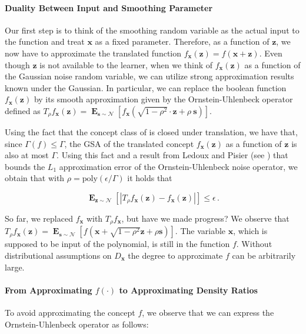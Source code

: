 \documentclass{theoretics}
\renewcommand\vec[1]{\mathbf{#1}}
\DeclareMathOperator*{\E}{\mathbf{E}}
\newcommand{\1}{\Ind}
\newcommand{\x}{\vec x}
\begin{document}
\paragraph{Duality Between Input and Smoothing Parameter}

Our first step is to think of the smoothing random variable as the actual input to the function and treat $\mathbf{x}$ as a fixed parameter. Therefore, as a function of $\mathbf{z}$, we now have to approximate the translated function $f_{\mathbf{x}}(\mathbf{z}) = f(\mathbf{x} + \mathbf{z})$. Even though $\mathbf{z}$ is not available to the learner, when we think of $f_{\mathbf{x}}(\mathbf{z})$ as a function of the Gaussian noise random variable, we can utilize strong approximation results known under the Gaussian. In particular, we can replace the boolean function $f_{\mathbf{x}}(\vec{z})$ by its smooth approximation given by the Ornstein-Uhlenbeck operator defined as $T_{\rho} f_{\mathbf{x}}(\mathbf{z})=\E_{\vec{s} \sim \mathcal{N}}[f_{\mathbf{x}}(\sqrt{1-\rho^2} \cdot \mathbf{z} + \rho ~ \vec{s} )]$.

Using the fact that the concept class of  is closed under translation, we have that, since $\Gamma(f) \leq \Gamma$, the GSA of the translated concept $f_{\mathbf{x}}(\mathbf{z})$ as a function of $\mathbf{z}$ is also at most $\Gamma$. Using this fact and a result from Ledoux and Pisier (see ) that bounds the $L_1$ approximation error of the Ornstein-Uhlenbeck noise operator, we obtain that with $\rho = \text{poly}(\epsilon/\Gamma)$ it holds that 

\[
\E_{\mathbf{z} \sim \mathcal{N}}[|T_\rho f_{\mathbf{x}}(\mathbf{z}) - f_{\mathbf{x}}(\mathbf{z})|] \leq \epsilon \,.
\]

So far, we replaced $f_{\mathbf{x}}$ with $T_\rho f_{\mathbf{x}}$, but have we made progress? We observe that $T_\rho f_{\mathbf{x}}(\mathbf{z}) = \E_{\vec{s} \sim \mathcal{N}}[f(\mathbf{x} + \sqrt{1-\rho^2} \mathbf{z} + \rho \vec{s})]$. The variable $\mathbf{x}$, which is supposed to be input of the polynomial, is still in the function $f$. Without distributional assumptions on $D_{\x}$ the degree to approximate $f$ can be arbitrarily large.

\paragraph{From Approximating $f(\cdot)$ to Approximating Density Ratios}

To avoid approximating the concept $f$, we observe that we can express the Ornstein-Uhlenbeck operator as follows:
\end{document}
